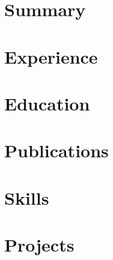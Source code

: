 \documentclass[english,a4paper,10pt]{article}
\begin{document}
\thispagestyle{firstpage}

\section{Summary}


\section{Experience}


\section{Education}


\section{Publications}


\section{Skills}


\section{Projects}


\end{document}
